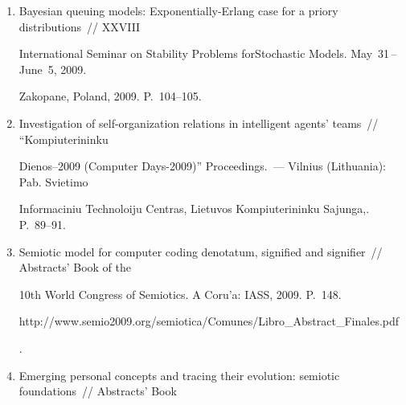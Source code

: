 \begin{enumerate}
A multichannel queuing system with group refusals of servers~// XXVIII International Seminar 


on Stability Problems for Stochastic Models. May~31\,--\,June~5, 2009. Zakopane, Poland, 2009. 


P.~68.





\item {}


Bayesian queuing models: Exponentially-Erlang case for a priory distributions~// XXVIII 


International Seminar on Stability Problems for\linebreak Stochastic Models. May~31\,--\,June~5, 2009. 


Zakopane, Poland, 2009. P.~104--105.





\item {}


Investigation of self-organization relations in intelligent agents' teams~// ``Kompiuterininku 


Dienos--2009 (Computer Days-2009)'' Proceedings.~--- Vilnius (Lithuania): Pab. Svietimo 


Informaciniu Technoloiju Centras, Lietuvos Kompiuterininku Sajunga,. P.~89--91.





\item {}


Semiotic model for computer coding denotatum, signified and signifier~// Abstracts' Book of the 


10th World Congress of Semiotics. A Coru'a: IASS, 2009. P.~148. {\sf 


http://\linebreak www.semio2009.org/semiotica/Comunes/Libro\_Abstract\_\linebreak Finales.pdf}.










\item {} 


Emerging personal concepts and tracing their evolution: semiotic foundations~// Abstracts' Book 



\end{enumerate}

